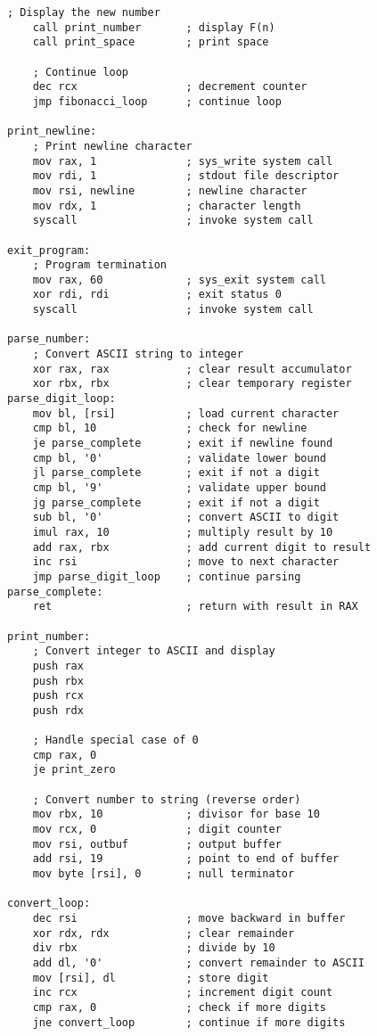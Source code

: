\documentclass[12pt,a4paper]{article}
\begin{document}
\begin{lstlisting}[caption=64-bit Fibonacci Series Program]
    ; Display the new number
    call print_number       ; display F(n)
    call print_space        ; print space

    ; Continue loop
    dec rcx                 ; decrement counter
    jmp fibonacci_loop      ; continue loop

print_newline:
    ; Print newline character
    mov rax, 1              ; sys_write system call
    mov rdi, 1              ; stdout file descriptor
    mov rsi, newline        ; newline character
    mov rdx, 1              ; character length
    syscall                 ; invoke system call

exit_program:
    ; Program termination
    mov rax, 60             ; sys_exit system call
    xor rdi, rdi            ; exit status 0
    syscall                 ; invoke system call

parse_number:
    ; Convert ASCII string to integer
    xor rax, rax            ; clear result accumulator
    xor rbx, rbx            ; clear temporary register
parse_digit_loop:
    mov bl, [rsi]           ; load current character
    cmp bl, 10              ; check for newline
    je parse_complete       ; exit if newline found
    cmp bl, '0'             ; validate lower bound
    jl parse_complete       ; exit if not a digit
    cmp bl, '9'             ; validate upper bound
    jg parse_complete       ; exit if not a digit
    sub bl, '0'             ; convert ASCII to digit
    imul rax, 10            ; multiply result by 10
    add rax, rbx            ; add current digit to result
    inc rsi                 ; move to next character
    jmp parse_digit_loop    ; continue parsing
parse_complete:
    ret                     ; return with result in RAX

print_number:
    ; Convert integer to ASCII and display
    push rax
    push rbx
    push rcx
    push rdx
    
    ; Handle special case of 0
    cmp rax, 0
    je print_zero
    
    ; Convert number to string (reverse order)
    mov rbx, 10             ; divisor for base 10
    mov rcx, 0              ; digit counter
    mov rsi, outbuf         ; output buffer
    add rsi, 19             ; point to end of buffer
    mov byte [rsi], 0       ; null terminator

convert_loop:
    dec rsi                 ; move backward in buffer
    xor rdx, rdx            ; clear remainder
    div rbx                 ; divide by 10
    add dl, '0'             ; convert remainder to ASCII
    mov [rsi], dl           ; store digit
    inc rcx                 ; increment digit count
    cmp rax, 0              ; check if more digits
    jne convert_loop        ; continue if more digits


\end{lstlisting}
\end{document}
